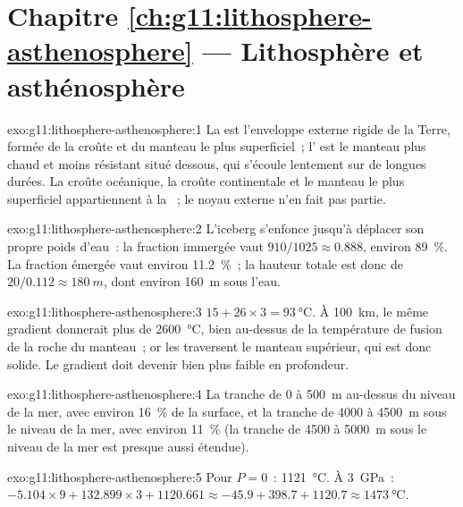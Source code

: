 \section*{Chapitre \ref{ch:g11:lithosphere-asthenosphere} --- Lithosphère et asthénosphère}

\begin{solution}{exo:g11:lithosphere-asthenosphere:1}
La  est l'enveloppe externe rigide de la Terre, formée de la
croûte et du manteau le plus superficiel~; l' est le manteau
plus chaud et moins résistant situé dessous, qui s'écoule lentement sur de
longues durées. La croûte océanique, la croûte continentale et le manteau le
plus superficiel appartiennent à la ~; le noyau externe n'en fait
pas partie.
\end{solution}

\begin{solution}{exo:g11:lithosphere-asthenosphere:2}
L'iceberg s'enfonce jusqu'à déplacer son propre poids d'eau~: la fraction
immergée vaut $910/1025 \approx 0.888$, environ \qty{89}{\percent}. La
fraction émergée vaut environ \qty{11.2}{\percent}~; la hauteur totale est
donc de $20/0.112 \approx \qty{180}{m}$, dont environ \qty{160}{m} sous
l'eau.
\end{solution}

\begin{solution}{exo:g11:lithosphere-asthenosphere:3}
$15 + 26 \times 3 = \qty{93}{\celsius}$. À \qty{100}{km}, le même gradient
donnerait plus de \qty{2600}{\celsius}, bien au-dessus de la température de
fusion de la roche du manteau~; or les  traversent le manteau
supérieur, qui est donc solide. Le gradient doit devenir bien plus faible en
profondeur.
\end{solution}

\begin{solution}{exo:g11:lithosphere-asthenosphere:4}
La tranche de 0 à \qty{500}{m} au-dessus du niveau de la mer, avec environ
\qty{16}{\percent} de la surface, et la tranche de 4000 à \qty{4500}{m}
sous le niveau de la mer, avec environ \qty{11}{\percent} (la tranche de
4500 à \qty{5000}{m} sous le niveau de la mer est presque aussi étendue).
\end{solution}

\begin{solution}{exo:g11:lithosphere-asthenosphere:5}
Pour $P = 0$~: \qty{1121}{\celsius}. À \qty{3}{GPa}~: $-5.104 \times 9 +
132.899 \times 3 + 1120.661 \approx -45.9 + 398.7 + 1120.7 \approx
\qty{1473}{\celsius}$.
\end{solution}


